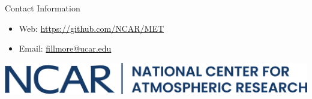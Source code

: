 \documentclass[final]{beamer}
\newlength{\onecolwid}
\begin{document}
\begin{frame}[containsverbatim]
\begin{columns}[t]
\begin{column}{\onecolwid}

\begin{alertblock}{Contact Information}

\begin{itemize}
\item Web: \href{https://github.com/NCAR/MET}{https://github.com/NCAR/MET}
\item Email: \href{mailto:fillmore@ucar.edu}{fillmore@ucar.edu}
\end{itemize}

\end{alertblock}

\begin{center}
\includegraphics[width=0.8\linewidth]{../logos/NCAR-contemp-logo-blue.png}
\end{center}


\end{column} %

\end{columns} %

\end{frame} %
\end{document}
